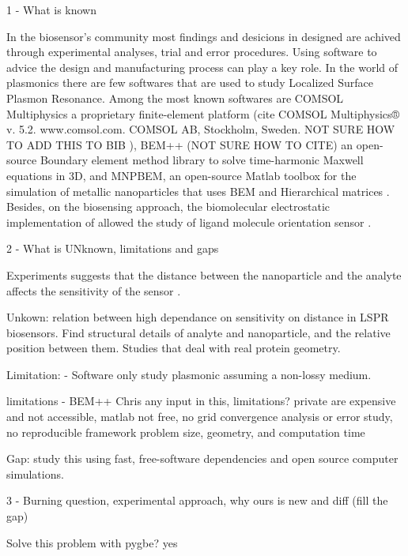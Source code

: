 1 - What is known

In the biosensor's community most findings and desicions in designed are achived 
through experimental analyses, trial and error procedures. Using
software to advice the design and manufacturing process can play a key role. In 
the world of plasmonics there are few softwares that are used to study Localized
Surface Plasmon Resonance. Among the most known softwares are COMSOL Multiphysics
a proprietary finite-element platform ({\color{red}cite COMSOL Multiphysics® v. 5.2. 
www.comsol.com. COMSOL AB, Stockholm, Sweden. NOT SURE HOW TO ADD THIS TO BIB} ), 
BEM++ ({\color{red}NOT SURE HOW TO CITE}) an open-source Boundary element method
library to solve time-harmonic Maxwell equations in 3D, and 
MNPBEM, an open-source Matlab toolbox for the simulation of metallic nanoparticles that
uses BEM and Hierarchical matrices \cite{Hohenester2018}. Besides, on the 
biosensing approach, the biomolecular electrostatic implementation of 
\pygbe \cite{CooperETal2016} allowed the study of ligand molecule orientation 
sensor \cite{CooperClementiBarba2015}.



2 - What is UNknown, limitations and gaps

Experiments suggests that the distance between the nanoparticle and the analyte 
affects the sensitivity of the sensor \cite{HaesETal2004}. 

Unkown: relation between high dependance on sensitivity on distance in LSPR biosensors.
Find structural details of analyte and nanoparticle, and the relative position between them.
Studies that deal with real protein geometry. 

Limitation: 
            - Software only study plasmonic assuming a non-lossy medium. 


limitations - BEM++ Chris any input in this, limitations?  
              private are expensive and not accessible, 
              matlab not free, 
              no grid convergence analysis or error study, 
              no reproducible framework 
              problem size, geometry, and computation time



Gap: study this using fast, free-software dependencies and open source computer
simulations. 





3 - Burning question, experimental approach, why ours is new and diff (fill the gap)

Solve this problem with pygbe? yes

